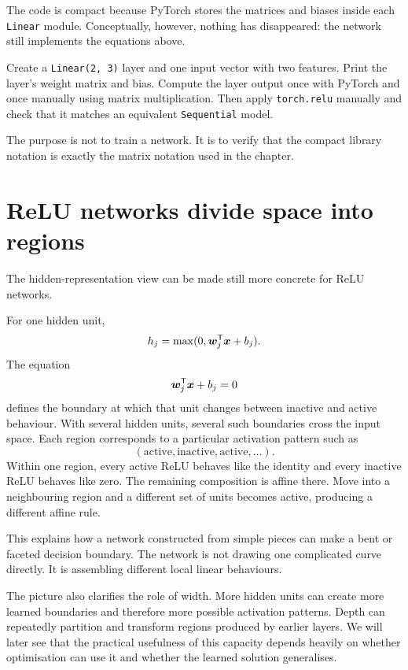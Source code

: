 The code is compact because PyTorch stores the matrices and biases inside each \texttt{Linear} module. Conceptually, however, nothing has disappeared: the network still implements the equations above.

\begin{optionalexercise}[title={Optional coding --- make the matrices visible}]
Create a \texttt{Linear(2, 3)} layer and one input vector with two features. Print the layer's weight matrix and bias. Compute the layer output once with PyTorch and once manually using matrix multiplication. Then apply \texttt{torch.relu} manually and check that it matches an equivalent \texttt{Sequential} model.

The purpose is not to train a network. It is to verify that the compact library notation is exactly the matrix notation used in the chapter.
\end{optionalexercise}

\section{ReLU networks divide space into regions}

The hidden-representation view can be made still more concrete for ReLU networks.

For one hidden unit,
\[
  h_j=\max(0,\bm{w}_j^{\mathsf T}\bm{x}+b_j).
\]
The equation
\[
  \bm{w}_j^{\mathsf T}\bm{x}+b_j=0
\]
defines the boundary at which that unit changes between inactive and active behaviour. With several hidden units, several such boundaries cross the input space. Each region corresponds to a particular activation pattern such as
\[
  (\text{active},\text{inactive},\text{active},\ldots).
\]
Within one region, every active ReLU behaves like the identity and every inactive ReLU behaves like zero. The remaining composition is affine there. Move into a neighbouring region and a different set of units becomes active, producing a different affine rule.

This explains how a network constructed from simple pieces can make a bent or faceted decision boundary. The network is not drawing one complicated curve directly. It is assembling different local linear behaviours.

The picture also clarifies the role of width. More hidden units can create more learned boundaries and therefore more possible activation patterns. Depth can repeatedly partition and transform regions produced by earlier layers. We will later see that the practical usefulness of this capacity depends heavily on whether optimisation can use it and whether the learned solution generalises.

